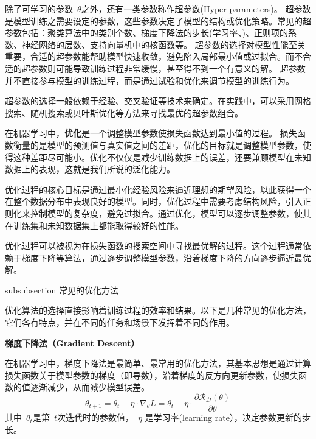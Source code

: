 除了可学习的参数~$\theta$之外，还有一类参数称作超参数(Hyper-parameters)。
超参数是模型训练之需要设定的参数，这些参数决定了模型的结构或优化策略。常见的超参数包括：聚类算法中的类别个数、梯度下降法的步长(学习率、)、正则项的系数、神经网络的层数、支持向量机中的核函数等。
超参数的选择对模型性能至关重要，合适的超参数能帮助模型快速收敛，避免陷入局部最小值或过拟合。而不合适的超参数则可能导致训练过程非常缓慢，甚至得不到一个有意义的解。
超参数并不直接参与模型的训练过程，而是通过试验和优化来调节模型的训练行为。

超参数的选择一般依赖于经验、交叉验证等技术来确定。在实践中，可以采用网格搜索、随机搜索或贝叶斯优化等方法来寻找最优的超参数组合。

在机器学习中，{\bf 优化}是一个调整模型参数使损失函数达到最小值的过程。
损失函数衡量的是模型的预测值与真实值之间的差距，优化的目标就是调整模型参数，使得这种差距尽可能小。优化不仅仅是减少训练数据上的误差，还要兼顾模型在未知数据上的表现，这就是我们所说的泛化能力。

优化过程的核心目标是通过最小化经验风险来逼近理想的期望风险，以此获得一个在整个数据分布中表现良好的模型。同时，优化过程中需要考虑结构风险，引入正则化来控制模型的复杂度，避免过拟合。通过优化，模型可以逐步调整参数，使其在训练集和未知数据集上都能取得较好的性能。

优化过程可以被视为在损失函数的搜索空间中寻找最优解的过程。这个过程通常依赖于梯度下降等算法，通过逐步调整模型参数，沿着梯度下降的方向逐步逼近最优解。

subsubsection{ 常见的优化方法}

优化算法的选择直接影响着训练过程的效率和结果。以下是几种常见的优化方法，它们各有特点，并在不同的任务和场景下发挥着不同的作用。 


 {\bf 梯度下降法（Gradient Descent）} 

在机器学习中，梯度下降法是最简单、最常用的优化方法，其基本思想是通过计算损失函数关于模型参数的梯度（即导数），沿着梯度的反方向更新参数，使损失函数的值逐渐减少，从而减少模型误差。
\begin{equation}\label{eq:gd}
    \theta_{t+1} = \theta_t - \eta \cdot \nabla_\theta L =   \theta_t - \eta \cdot \frac{\partial \mathcal{R_D}(\theta)}{\partial \theta}    
\end{equation}
    其中~$ \theta_t$是第~$t$次迭代时的参数值，~$\eta$ 是学习率(learning rate），决定参数更新的步长。
    
